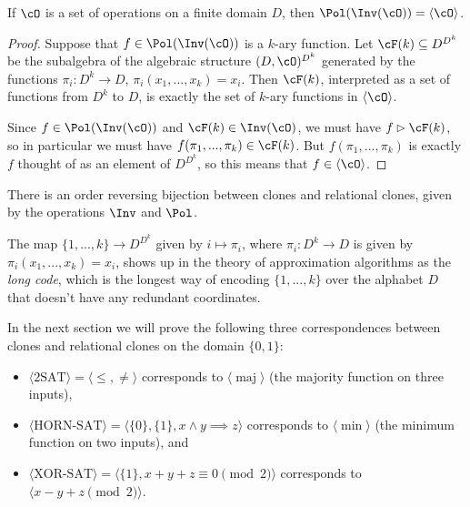 \begin{thm} If $\cO$ is a set of operations on a finite domain $D$, then $\Pol(\Inv(\cO)) = \langle \cO \rangle$.
\end{thm}
\begin{proof} Suppose that $f \in \Pol(\Inv(\cO))$ is a $k$-ary function. Let $\cF(k) \subseteq D^{D^k}$ be the subalgebra of the algebraic structure $(D,\cO)^{D^k}$ generated by the functions $\pi_i : D^k \rightarrow D$, $\pi_i(x_1, ..., x_k) = x_i$. Then $\cF(k)$, interpreted as a set of functions from $D^k$ to $D$, is exactly the set of $k$-ary functions in $\langle \cO \rangle$.

Since $f \in \Pol(\Inv(\cO))$ and $\cF(k) \in \Inv(\cO)$, we must have $f \rhd \cF(k)$, so in particular we must have $f(\pi_1, ..., \pi_k) \in \cF(k)$. But $f(\pi_1, ..., \pi_k)$ is exactly $f$ thought of as an element of $D^{D^k}$, so this means that $f \in \langle \cO \rangle$.
\end{proof}

\begin{cor} There is an order reversing bijection between clones and relational clones, given by the operations $\Inv$ and $\Pol$.
\end{cor}

\begin{rem} The map $\{1, ..., k\} \rightarrow D^{D^k}$ given by $i \mapsto \pi_i$, where $\pi_i : D^k \rightarrow D$ is given by $\pi_i(x_1, ..., x_k) = x_i$, shows up in the theory of approximation algorithms as the \emph{long code}, which is the longest way of encoding $\{1, ..., k\}$ over the alphabet $D$ that doesn't have any redundant coordinates.
\end{rem}

\begin{ex} In the next section we will prove the following three correspondences between clones and relational clones on the domain $\{0,1\}$:
\begin{itemize}
\item $\langle \text{2SAT} \rangle = \langle \le, \ne \rangle$ corresponds to $\langle \operatorname{maj} \rangle$ (the majority function on three inputs),

\item $\langle \text{HORN-SAT} \rangle = \langle \{0\}, \{1\}, x\wedge y\implies z \rangle$ corresponds to $\langle \min \rangle$ (the minimum function on two inputs), and

\item $\langle \text{XOR-SAT} \rangle = \langle \{1\}, x+y+z \equiv 0 \pmod{2} \rangle$ corresponds to $\langle x-y+z \pmod{2} \rangle$.
\end{itemize}
\end{ex}

